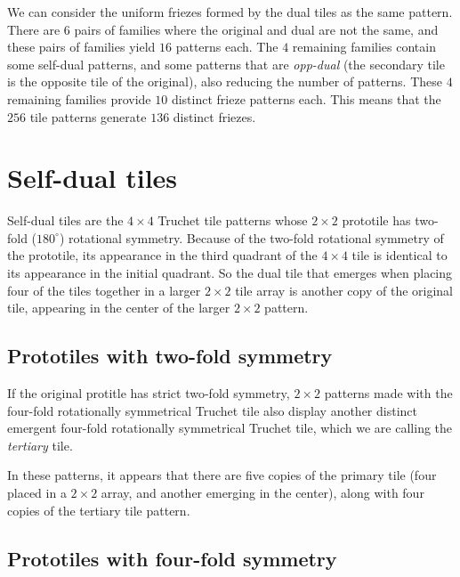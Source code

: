 \documentclass{tufte-book}
\begin{document}
\vspace{0.5cm}
\noindent
We can consider the uniform friezes formed by the dual tiles as the same pattern. There are $6$ pairs of families where the original and dual are not the same, and these pairs of families yield $16$ patterns each. The $4$ remaining families contain some self-dual patterns, and some patterns that are \textit{opp-dual} (the secondary tile is the opposite tile of the original), also reducing the number of patterns. These $4$ remaining families provide $10$ distinct frieze patterns each. This means that the $256$ tile patterns generate $136$ distinct friezes. 

\vspace{0.5cm}
\noindent

\noindent
\newpage



\chapter{Self-dual tiles}

\noindent
Self-dual tiles are the $4\times 4$ Truchet tile patterns whose $2\times 2$ prototile has two-fold ($180^{\circ}$) rotational symmetry. Because of the two-fold rotational symmetry of the prototile, its appearance in the third quadrant of the $4\times 4$ tile is identical to its appearance in the initial quadrant. So the dual tile that emerges when placing four of the tiles together in a larger $2\times 2$ tile array is another copy of the original tile, appearing in the center of the  larger $2\times 2$ pattern. 

\setlength{\tabcolsep}{0pt}
\renewcommand{\arraystretch}{0}
\section{Prototiles with two-fold symmetry}

If the original protitle has strict two-fold symmetry,  $2\times 2$ patterns made with the four-fold rotationally symmetrical Truchet tile also display another distinct emergent four-fold rotationally symmetrical Truchet tile, which we are calling the \textit{tertiary} tile. 

\noindent
In these patterns, it appears that there are five copies of the primary tile (four placed in a $2\times 2$ array, and another emerging in the center), along with four copies of the tertiary tile pattern.


\section{Prototiles with four-fold symmetry}
\end{document}
